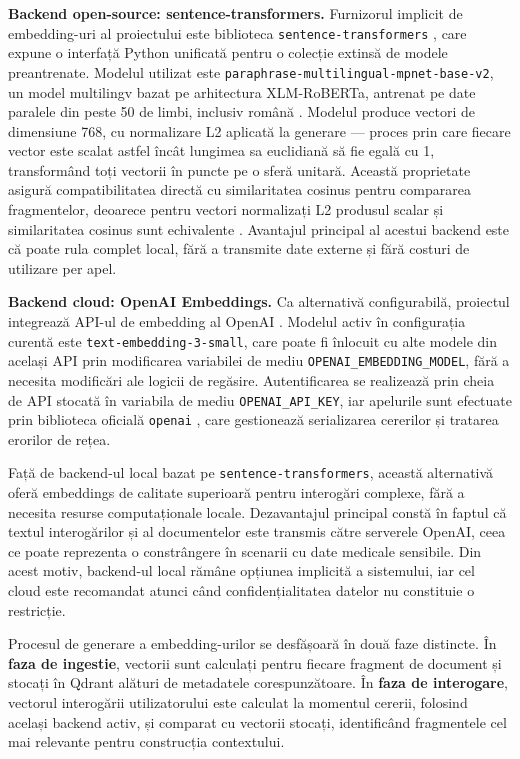 \documentclass[12pt, a4paper, oneside, romanian]{teza-upb}
\begin{document}
\textbf{Backend open-source: sentence-transformers.} Furnizorul implicit de 
embedding-uri al proiectului este biblioteca \texttt{sentence-transformers} 
\cite{sentence_transformers_doc}, care expune o interfață Python unificată pentru 
o colecție extinsă de modele preantrenate. Modelul utilizat este 
\texttt{paraphrase-multilingual-mpnet-base-v2}, un model multilingv bazat pe 
arhitectura XLM-RoBERTa, antrenat pe date paralele din peste 50 de limbi, 
inclusiv română \cite{paraphrase_multilingual_mpnet}. Modelul produce vectori de dimensiune 768, cu normalizare L2 aplicată la 
generare — proces prin care fiecare vector este scalat astfel încât lungimea 
sa euclidiană să fie egală cu 1, transformând toți vectorii în puncte pe o 
sferă unitară. Această proprietate asigură compatibilitatea directă cu 
similaritatea cosinus pentru compararea fragmentelor, deoarece pentru vectori 
normalizați L2 produsul scalar și similaritatea cosinus sunt echivalente 
\cite{paraphrase_multilingual_mpnet}. Avantajul principal al acestui backend 
este că poate rula complet local, fără a transmite date externe și fără costuri 
de utilizare per apel.

\textbf{Backend cloud: OpenAI Embeddings.} Ca alternativă configurabilă, 
proiectul integrează API-ul de embedding al OpenAI \cite{openai_embeddings}. 
Modelul activ în configurația curentă este \texttt{text-embedding-3-small}, 
care poate fi înlocuit cu alte modele din același API prin modificarea 
variabilei de mediu \texttt{OPENAI\_EMBEDDING\_MODEL}, fără a necesita 
modificări ale logicii de regăsire. Autentificarea se realizează prin cheia 
de API stocată în variabila de mediu \texttt{OPENAI\_API\_KEY}, iar apelurile 
sunt efectuate prin biblioteca oficială \texttt{openai} \cite{openai_api}, 
care gestionează serializarea cererilor și tratarea erorilor de rețea.

Față de backend-ul local bazat pe \texttt{sentence-transformers}, această 
alternativă oferă embeddings de calitate superioară pentru interogări complexe, 
fără a necesita resurse computaționale locale. Dezavantajul principal constă 
în faptul că textul interogărilor și al documentelor este transmis către 
serverele OpenAI, ceea ce poate reprezenta o constrângere în scenarii cu date 
medicale sensibile. Din acest motiv, backend-ul local rămâne opțiunea implicită 
a sistemului, iar cel cloud este recomandat atunci când confidențialitatea 
datelor nu constituie o restricție.

Procesul de generare a embedding-urilor se desfășoară în două faze distincte. În \textbf{faza de ingestie}, vectorii sunt calculați pentru fiecare fragment de document și stocați în Qdrant alături de metadatele corespunzătoare. În \textbf{faza de interogare}, vectorul interogării utilizatorului este calculat la momentul cererii, folosind același backend activ, și comparat cu vectorii stocați, identificând fragmentele cel mai relevante pentru construcția contextului.
\end{document}
